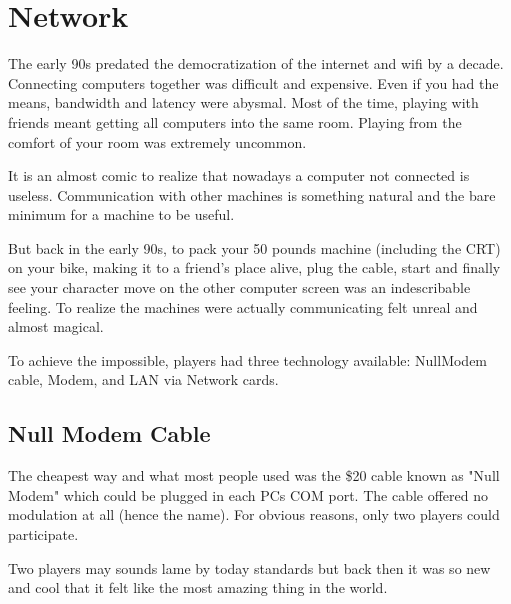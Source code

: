 \section{Network}
The early 90s predated the democratization of the internet and wifi by a decade. Connecting computers together was difficult and expensive. Even if you had the means, bandwidth and latency were abysmal. Most of the time, playing with friends meant getting all computers into the same room. Playing from the comfort of your room was extremely uncommon.\\
\par
It is an almost comic to realize that nowadays a computer not connected is useless. Communication with other machines is something natural and the bare minimum for a machine to be useful.\\
\par
 But back in the early 90s, to pack your 50 pounds machine (including the CRT) on your bike, making it to a friend's place alive, plug the cable, start \doom and finally see your character move on the other computer screen was an indescribable feeling. To realize the machines were actually communicating felt unreal and almost magical.\\
\par 
To achieve the impossible, players had three technology available: NullModem cable, Modem, and LAN via Network cards.\\
\par









\subsection{Null Modem Cable}
The cheapest way and what most people used was the \$20 cable known as "Null Modem" which could be plugged in each PCs COM port. The cable offered no modulation at all (hence the name). For obvious reasons, only two players could participate.\\
\par 
{}
\par
 Two players may sounds lame by today standards but back then it was so new and cool that it felt like the most amazing thing in the world.







